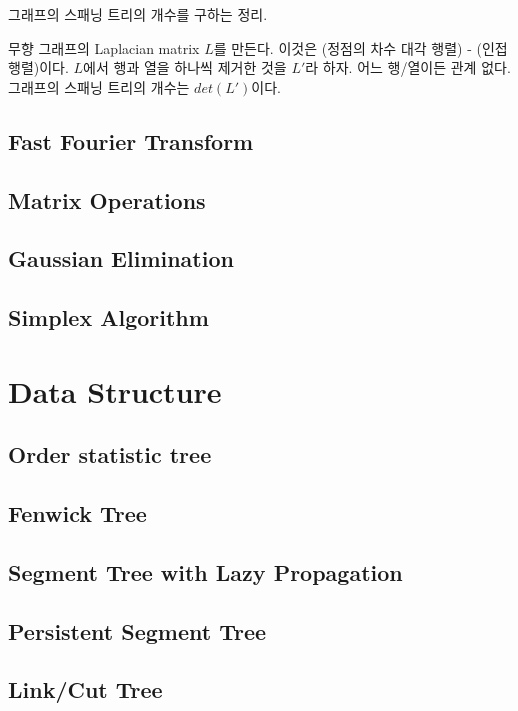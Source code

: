 \documentclass[10pt,landscape,a4paper,twocolumn]{article}
\begin{document}
그래프의 스패닝 트리의 개수를 구하는 정리.

무향 그래프의 Laplacian matrix $L$를 만든다. 이것은 (정점의 차수 대각 행렬) - (인접행렬)이다.
$L$에서 행과 열을 하나씩 제거한 것을 $L'$라 하자. 어느 행/열이든 관계 없다.
그래프의 스패닝 트리의 개수는 $det(L')$이다.

\subsection{Fast Fourier Transform}

\subsection{Matrix Operations}

\subsection{Gaussian Elimination}

\subsection{Simplex Algorithm}


\section{Data Structure}

\subsection{Order statistic tree}


\subsection{Fenwick Tree}


\subsection{Segment Tree with Lazy Propagation}

\subsection{Persistent Segment Tree}

\subsection{Link/Cut Tree}
\end{document}
